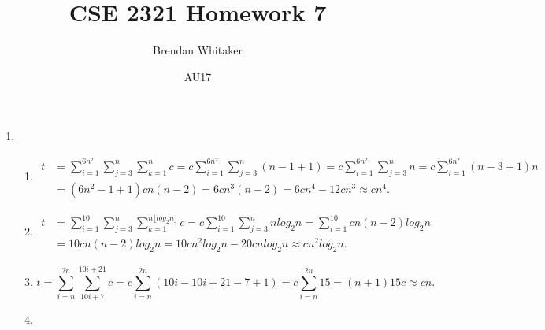 \documentclass[10pt,oneside,reqno]{amsart}
\theoremstyle{plain}
\theoremstyle{definition}
\begin{document}
\title{CSE 2321 Homework 7}

\date{AU17}

\author[Brendan Whitaker]{Brendan Whitaker}

\maketitle

\begin{enumerate}[label=2.]

\item 

\begin{enumerate}

\item 

\begin{equation}
\begin{aligned}
t &= \sum_{i = 1}^{6n^2} \sum_{j = 3}^n \sum_{k = 1}^n c = c\sum_{i = 1}^{6n^2} \sum_{j = 3}^n (n -1 + 1) = c\sum_{i = 1}^{6n^2} \sum_{j = 3}^n n = c\sum_{i = 1}^{6n^2} (n - 3 + 1)n \\
&= (6n^2 - 1 + 1)cn(n - 2) = 6cn^3(n - 2) = 6cn^4 - 12cn^3 \approx cn^4. 
\end{aligned}
\end{equation}

\item 

\begin{equation}
\begin{aligned}
t &= \sum_{i = 1}^{10} \sum_{j = 3}^n \sum_{k = 1}^{n\lfloor log_2n\rfloor} c = c\sum_{i = 1}^{10} \sum_{j = 3}^n nlog_2n 
 = \sum_{i = 1}^{10} cn(n - 2)log_2n \\
 &= 10cn(n - 2)log_2n = 10cn^2log_2n - 20cnlog_2n \approx cn^2log_2n.
\end{aligned}
\end{equation}

\item 

\[t = \sum_{i = n}^{2n} \sum_{10i + 7}^{10i + 21} c = c\sum_{i = n}^{2n}(10i - 10i + 21 - 7 + 1) = c\sum_{i = n}^{2n} 15 = (n + 1)15c \approx cn.\]

\item 


\end{enumerate}
\end{enumerate}
\end{document}
